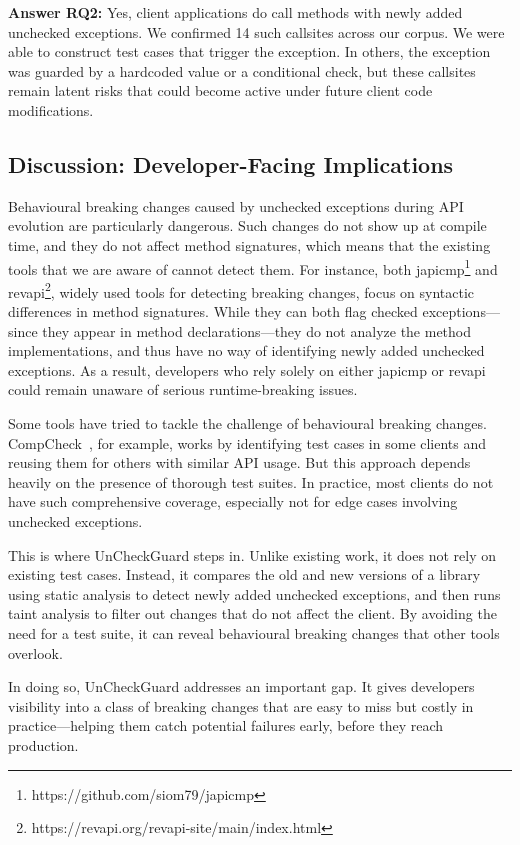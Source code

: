 \vspace{1em}
\begin{tcolorbox}[colback=gray!10, colframe=black]
\textbf{Answer RQ2:} Yes, client applications do call methods with newly added unchecked exceptions. We confirmed 14 such callsites across our corpus. We were able to construct test cases that trigger the exception. In others, the exception was guarded by a hardcoded value or a conditional check, but these callsites remain latent risks that could become active under future client code modifications.
\end{tcolorbox}
\vspace{1em}

\subsection{Discussion: Developer-Facing Implications}

Behavioural breaking changes caused by unchecked exceptions during API evolution are particularly dangerous. Such changes do not show up at compile time, and they do not affect method signatures, which means that the existing tools that we are aware of cannot detect them. For instance, both japicmp\footnote{https://github.com/siom79/japicmp} and revapi\footnote{https://revapi.org/revapi-site/main/index.html}, widely used tools for detecting breaking changes, focus on syntactic differences in method signatures. While they can both flag checked exceptions—since they appear in method declarations—they do not analyze the method implementations, and thus have no way of identifying newly added unchecked exceptions. As a result, developers who rely solely on either japicmp or revapi could remain unaware of serious runtime-breaking issues.

Some tools have tried to tackle the challenge of behavioural breaking changes. CompCheck~\cite{CompCheck}, for example, works by identifying test cases in some clients and reusing them for others with similar API usage. But this approach depends heavily on the presence of thorough test suites. In practice, most clients do not have such comprehensive coverage, especially not for edge cases involving unchecked exceptions.

This is where UnCheckGuard steps in. Unlike existing work, it does not rely on existing test cases. Instead, it compares the old and new versions of a library using static analysis to detect newly added unchecked exceptions, and then runs taint analysis to filter out changes that do not affect the client. By avoiding the need for a test suite, it can reveal behavioural breaking changes that other tools overlook.

In doing so, UnCheckGuard addresses an important gap. It gives developers visibility into a class of breaking changes that are easy to miss but costly in practice—helping them catch potential failures early, before they reach production.

